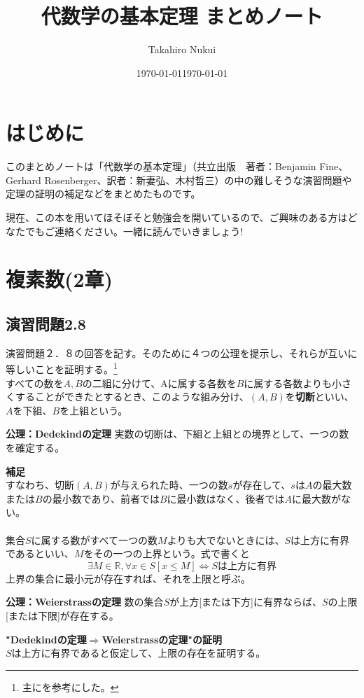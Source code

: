 \documentclass[10pt]{jarticle}
\title{代数学の基本定理 まとめノート}
\author{Takahiro Nukui}
\date{\today}
\begin{document}
\maketitle
\tableofcontents

\newpage

\section{はじめに}
このまとめノートは「代数学の基本定理」（共立出版　著者：Benjamin Fine、Gerhard Rosenberger、訳者：新妻弘、木村哲三）の中の難しそうな演習問題や定理の証明の補足などをまとめたものです。\date{\today}現在、この本を用いてほそぼそと勉強会を開いているので、ご興味のある方はどなたでもご連絡ください。一緒に読んでいきましょう!

\newpage


\section{複素数(2章)}
\subsection{演習問題2.8}
演習問題２．８の回答を記す。そのために４つの公理を提示し、それらが互いに等しいことを証明する。\footnote{主に\cite{高木}を参考にした。}\\


 すべての数を$A,B$の二組に分けて、Aに属する各数を$B$に属する各数よりも小さくすることができたとするとき、このような組み分け、$(A,B)$を\textbf{切断}といい、$A$を下組、$B$を上組という。
\begin{itembox}[l]{\textbf{公理：Dedekindの定理}}
実数の切断は、下組と上組との境界として、一つの数を確定する。
\end{itembox}
\textbf{補足}\\
すなわち、切断$(A,B)$が与えられた時、一つの数$s$が存在して、$s$は$A$の最大数または$B$の最小数であり、前者では$B$に最小数はなく、後者では$A$に最大数がない。
\\
\\


集合$S$に属する数がすべて一つの数$M$よりも大でないときには、$S$は上方に有界であるといい、$M$をその一つの上界という。式で書くと
\[\exists M\in\mathbb{R},\forall x\in S[x\leq M] \Longleftrightarrow Sは上方に有界\]
上界の集合に最小元が存在すれば、それを上限と呼ぶ。
\begin{itembox}[l]{\textbf{公理：Weierstrassの定理}}
数の集合$S$が上方[または下方]に有界ならば、$S$の上限[または下限]が存在する。
\end{itembox}
\textbf{"Dedekindの定理$\Longrightarrow$Weierstrassの定理"の証明}\\
$S$は上方に有界であると仮定して、上限の存在を証明する。
\end{document}
